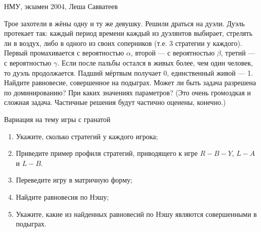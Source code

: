 














\begin{problem}[Дуэль.] 
\begin{source}
НМУ, экзамен 2004, Леша Савватеев
\end{source}
Трое захотели в жёны одну и ту же девушку. Решили драться на дуэли. Дуэль протекает так: каждый период времени каждый из дуэлянтов выбирает, стрелять ли в воздух, либо в одного из своих соперников (т.е. 3 стратегии у каждого). Первый промахивается с вероятностью $\alpha$, второй --- с вероятностью $\beta$, третий --- с вероятностью $\gamma$. Если после пальбы остался в живых более, чем один человек, то дуэль продолжается. Падший мёртвым получает 0, единственный живой --- 1. Найдите равновесие, совершенное на подыграх. Может ли быть задача разрешена по доминированию? При каких значениях параметров? (Это очень громоздкая и сложная задача. Частичные решения будут частично оценены, конечно.)

\begin{sol}

\end{sol}
\end{problem}




\begin{problem}
 Вариация на тему игры с гранатой\par
\begin{enumerate}
\item  Укажите, сколько стратегий у каждого игрока;\par
\item Приведите пример профиля стратегий, приводящего к игре  $R-B-Y$,  $L-A$  и  $L-B$.\par
\item  Переведите игру в матричную форму;\par
\item Найдите равновесия по Нэшу;\par
\item Укажите, какие из найденных равновесий по Нэшу являются совершенными в подыграх.
\end{enumerate}

\begin{sol}

\end{sol}
\end{problem}



